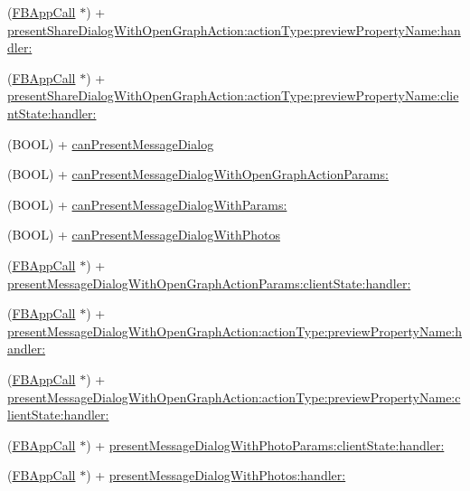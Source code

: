 \begin{DoxyCompactItemize}
\item 
(\hyperlink{interfaceFBAppCall}{F\+B\+App\+Call} $\ast$) + \hyperlink{interfaceFBDialogs_a17f88dc21a7f13474d310e4dd3e0d781}{present\+Share\+Dialog\+With\+Open\+Graph\+Action\+:action\+Type\+:preview\+Property\+Name\+:handler\+:}
\item 
(\hyperlink{interfaceFBAppCall}{F\+B\+App\+Call} $\ast$) + \hyperlink{interfaceFBDialogs_ad40b913195e68f5449fb0afab6c5a4b5}{present\+Share\+Dialog\+With\+Open\+Graph\+Action\+:action\+Type\+:preview\+Property\+Name\+:client\+State\+:handler\+:}
\item 
(B\+O\+OL) + \hyperlink{interfaceFBDialogs_aa41db27dd00b0c59e01d45f72b9045aa}{can\+Present\+Message\+Dialog}
\item 
(B\+O\+OL) + \hyperlink{interfaceFBDialogs_abc596dd117701ceb160dd63db514cf11}{can\+Present\+Message\+Dialog\+With\+Open\+Graph\+Action\+Params\+:}
\item 
(B\+O\+OL) + \hyperlink{interfaceFBDialogs_a81544299ca98179464ec34fc0e8d12b7}{can\+Present\+Message\+Dialog\+With\+Params\+:}
\item 
(B\+O\+OL) + \hyperlink{interfaceFBDialogs_ac10e310c30d763c7885c11fb44ac4924}{can\+Present\+Message\+Dialog\+With\+Photos}
\item 
(\hyperlink{interfaceFBAppCall}{F\+B\+App\+Call} $\ast$) + \hyperlink{interfaceFBDialogs_a5bca1ea62e067e9bdb417526be737bb7}{present\+Message\+Dialog\+With\+Open\+Graph\+Action\+Params\+:client\+State\+:handler\+:}
\item 
(\hyperlink{interfaceFBAppCall}{F\+B\+App\+Call} $\ast$) + \hyperlink{interfaceFBDialogs_a0f030b33a0565ec590e4abe56e147dc0}{present\+Message\+Dialog\+With\+Open\+Graph\+Action\+:action\+Type\+:preview\+Property\+Name\+:handler\+:}
\item 
(\hyperlink{interfaceFBAppCall}{F\+B\+App\+Call} $\ast$) + \hyperlink{interfaceFBDialogs_abcc422b112c828ff673681fbf4d7ccc1}{present\+Message\+Dialog\+With\+Open\+Graph\+Action\+:action\+Type\+:preview\+Property\+Name\+:client\+State\+:handler\+:}
\item 
(\hyperlink{interfaceFBAppCall}{F\+B\+App\+Call} $\ast$) + \hyperlink{interfaceFBDialogs_a4354b3266eb59fa77f04d88a4e6cda32}{present\+Message\+Dialog\+With\+Photo\+Params\+:client\+State\+:handler\+:}
\item 
(\hyperlink{interfaceFBAppCall}{F\+B\+App\+Call} $\ast$) + \hyperlink{interfaceFBDialogs_a47a8fb26e758e8b8da4843ce641a3fe6}{present\+Message\+Dialog\+With\+Photos\+:handler\+:}
\item 

\end{DoxyCompactItemize}
